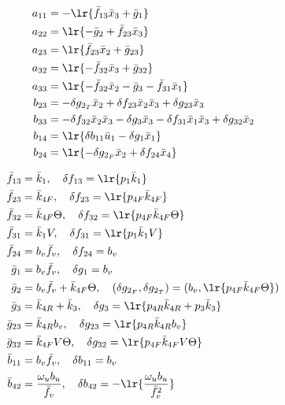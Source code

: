 \begin{itemize}
\begin{minipage}{0.49 \textwidth}
\begin{align*}
    \small
    a_{11} &= -\lr{ \bar f_{13} \bar x_3 + \bar g_1 } \\
    a_{22} &= \lr{ -\bar g_2 + \bar f_{23} \bar x_3 } \\
    a_{23} &= \lr{\bar f_{23} \bar x_2 + \bar g_{23}} \\
    a_{32} &= \lr{-\bar f_{32} \bar x_3 + \bar g_{32} } \\
    a_{33} &= \lr{-\bar f_{32} \bar x_2 - \bar g_3 - \bar f_{31} \bar x_1}  \\
    b_{23} &= -\delta g_{2_T} \bar x_2 + \delta f_{23} \bar x_2 \bar x_3 + \delta g_{23} \bar x_3 \\
    b_{33} &= -\delta f_{32} \bar x_2 \bar x_3 - \delta g_3 \bar x_3 - \delta f_{31} \bar x_1 \bar x_3 + \delta g_{32} \bar x_2 \\
    b_{14} &= \lr{\delta b_{11} \bar u_1- \delta g_1 \bar x_1} \\
    b_{24} &= \lr{-\delta g_{2_F} \bar x_2 + \delta f_{24} \bar x_4 }\\
\end{align*}
\end{minipage}
\begin{minipage}{0.49\textwidth}
\begin{align*}
    \bar f_{13} &= \bar k_{1}, \quad
    \delta f_{13}  = \lr{ p_{1} \bar k_{1} } \\
    \bar f_{23} &= \bar k_{4F}, \quad
    \delta f_{23} = \lr{ p_{4F} \bar k_{4F} } \\
    \bar f_{32} &= \bar k_{4F} \Theta, \quad
    \delta f_{32}  = \lr{ p_{4F}  \bar k_{4F} \Theta }
    \\
    \bar f_{31} &= \bar k_1 V, \quad
    \delta f_{31}  = \lr{ p_1 \bar k_1 V }
    \\
    \bar f_{24} &= b_v \bar f_v,
    \quad
    \delta f_{24}  = b_v
    \\
   \bar g_1 &= b_v \bar f_v,
    \quad
    \delta g_1  = b_v
    \\
   \bar g_2 &= b_v \bar f_v + \bar k_{4F} \Theta,
    \quad
    (\delta g_{2_F} , \delta g_{2_T}) = (b_v,  \lr{ p_{4F}  \bar k_{4F}  \Theta })
    \\
    \bar g_3 &= \bar k_{4R} + \bar k_3,
    \quad
    \delta g_3 = \lr{ p_{4R} \bar k_{4R} + p_3 \bar k_3}
    \\
    \bar g_{23} &= \bar k_{4R} b_v,
    \quad
    \delta g_{23}  = \lr{ p_{4R} \bar k_{4R} b_v }
    \\
    \bar g_{32} &= \bar k_{4F} V \Theta,
    \quad
    \delta g_{32}  = \lr{ p_{4F} \bar k_{4F} V \Theta }
    \\
    \bar b_{11} &= b_v \bar f_v,
    \quad
    \delta b_{11}  = b_v
    \\
    \bar b_{42} &= \frac{\omega_u b_u}{\bar f_v},
    \quad
    \delta b_{42}  = -\lr{\frac{\omega_u b_u}{\bar f_v^2}}
\end{align*}
\end{minipage}

\end{itemize}
